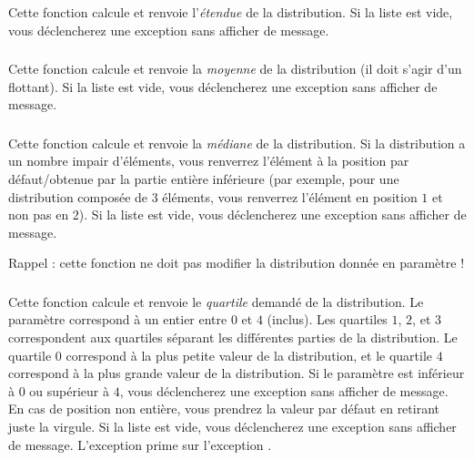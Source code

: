 \noindent Cette fonction calcule et renvoie l'\textit{étendue} de la distribution.
Si la liste est vide, vous déclencherez une exception  sans afficher de message.



\subsubsection*{}

\noindent Cette fonction calcule et renvoie la \textit{moyenne} de la distribution (il doit s'agir d'un flottant).
Si la liste est vide, vous déclencherez une exception  sans afficher de message.


\subsubsection*{}

\noindent Cette fonction calcule et renvoie la \textit{médiane} de la distribution.
Si la distribution a un nombre impair d'éléments, vous renverrez l'élément à la position par défaut/obtenue par la partie entière inférieure (par exemple, pour une distribution composée de $ 3 $ éléments, vous renverrez l'élément en position $ 1 $ et non pas en $ 2 $).
Si la liste est vide, vous déclencherez une exception  sans afficher de message.

\medskip

\noindent Rappel : cette fonction ne doit pas modifier la distribution donnée en paramètre !


\subsubsection*{}

\noindent Cette fonction calcule et renvoie le \textit{quartile} demandé de la distribution.
Le paramètre  correspond à un entier entre $ 0 $ et $ 4 $ (inclus).
Les quartiles $ 1 $, $ 2 $, et $ 3 $ correspondent aux quartiles séparant les différentes parties de la distribution.
Le quartile $ 0 $ correspond à la plus petite valeur de la distribution, et le quartile $ 4 $ correspond à la plus grande valeur de la distribution.
Si le paramètre  est inférieur à $ 0 $ ou supérieur à $ 4 $, vous déclencherez une exception  sans afficher de message.
En cas de position non entière, vous prendrez la valeur par défaut en retirant juste la virgule.
Si la liste est vide, vous déclencherez une exception  sans afficher de message.
L'exception  prime sur l'exception .


